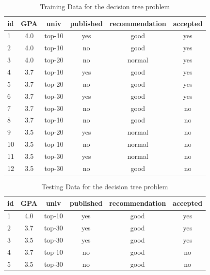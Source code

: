 \documentclass[12pt,letterpaper]{article}
\begin{document}
				\begin{table}[!h]
					\centering
					\begin{tabular}{l|cccc|c}
						\hline
						
						\hline
						{\bf id} & {\bf GPA} & {\bf univ}  & {\bf published} & {\bf recommendation} & {\bf accepted} \\ \hline
						1 & 4.0 &  top-10 &  yes &  good & yes  \\ 
						2& 4.0&  top-10&  no&  good& yes  \\ 
						3& 4.0&  top-20&  no&  normal&  yes  \\ 
						4& 3.7&  top-10&  yes&  good&  yes  \\ 
						5& 3.7&  top-20&  no&  good&  yes  \\ 
						6& 3.7&  top-30&  yes&  good&  yes  \\ 
						7& 3.7&  top-30&  no&  good& no   \\ 
						8& 3.7&  top-10&  no&  good& no   \\ 
						9& 3.5&  top-20&  yes&  normal& no   \\ 
						10& 3.5&  top-10&  no&  normal& no   \\ 
						11& 3.5&  top-30&  yes&  normal& no  \\ 
						12& 3.5&  top-30&  no&  good& no  \\ 
						\hline
						
						\hline
					\end{tabular}
					\caption{Training Data for the decision tree problem}
					\label{tab:dt}
				\end{table}
				
				\begin{table}[!h]
					\centering
					\begin{tabular}{l|cccc|c}
						\hline
						
						\hline
						{\bf id} & {\bf GPA} & {\bf univ}  & {\bf published} & {\bf recommendation} & {\bf accepted} \\ \hline
						1& 4.0 &  top-10 &  yes &  good & yes  \\ 
						2& 3.7&  top-30&  yes&  good&  yes  \\
						3& 3.5&  top-30&  yes&  good&  yes  \\ 		
						4& 3.7&  top-10&  no&  good& no   \\ 
						5& 3.5&  top-30&  no&  good& no  \\ 
						\hline
						
						\hline
					\end{tabular}
					\caption{Testing Data for the decision tree problem}
					\label{tab:dt-test}	
				\end{table}
				
\end{document}
